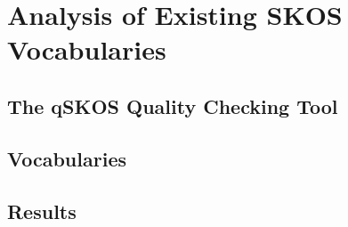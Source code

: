\section{Analysis of Existing SKOS Vocabularies}\label{sec:analysis}

\subsection{The qSKOS Quality Checking Tool}

\subsection{Vocabularies}

\subsection{Results}
